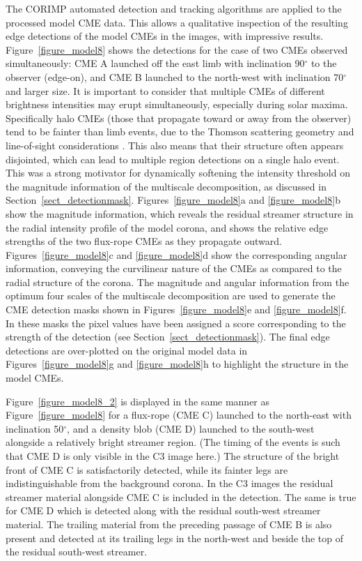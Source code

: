 \documentclass[preprint2]{aastex}
\begin{document}
The CORIMP automated detection and tracking algorithms are applied to the processed model CME data. This allows a qualitative inspection of the resulting edge detections of the model CMEs in the images, with impressive results. Figure~\ref{figure_model8} shows the detections for the case of two CMEs observed simultaneously: CME A launched off the east limb with inclination 90$^{\circ}$ to the observer (edge-on), and CME B launched to the north-west with inclination 70$^{\circ}$ and larger size. It is important to consider that multiple CMEs of different brightness intensities may erupt simultaneously, especially during solar maxima. Specifically halo CMEs (those that propagate toward or away from the observer) tend to be fainter than limb events, due to the Thomson scattering geometry and line-of-sight considerations \citep{2006ApJ...642.1216V}. This also means that their structure often appears disjointed, which can lead to multiple region detections on a single halo event. This was a strong motivator for dynamically softening the intensity threshold on the magnitude information of the multiscale decomposition, as discussed in Section~\ref{sect_detectionmask}. Figures~\ref{figure_model8}a and \ref{figure_model8}b show the magnitude information, which reveals the residual streamer structure in the radial intensity profile of the model corona, and shows the relative edge strengths of the two flux-rope CMEs as they propagate outward. Figures~\ref{figure_model8}c and \ref{figure_model8}d show the corresponding angular information, conveying the curvilinear nature of the CMEs as compared to the radial structure of the corona. The magnitude and angular information from the optimum four scales of the multiscale decomposition are used to generate the CME detection masks shown in Figures~\ref{figure_model8}e and \ref{figure_model8}f. In these masks the pixel values have been assigned a score corresponding to the strength of the detection (see Section~\ref{sect_detectionmask}). The final edge detections are over-plotted on the original model data in Figures~\ref{figure_model8}g and \ref{figure_model8}h to highlight the structure in the model CMEs.

Figure~\ref{figure_model8_2} is displayed in the same manner as Figure~\ref{figure_model8} for a flux-rope (CME C) launched to the north-east with inclination 50$^{\circ}$, and a density blob (CME D) launched to the south-west alongside a relatively bright streamer region. (The timing of the events is such that CME D is only visible in the C3 image here.) The structure of the bright front of CME C is satisfactorily detected, while its fainter legs are indistinguishable from the background corona. In the C3 images the residual streamer material alongside CME C is included in the detection. The same is true for CME D which is detected along with the residual south-west streamer material. The trailing material from the preceding passage of CME B is also present and detected at its trailing legs in the north-west and beside the top of the residual south-west streamer.
\end{document}
